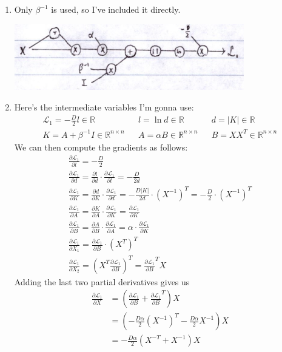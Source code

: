 \documentclass[12pt]{article}
\newcommand{\loss}{\mathcal{L}}
\newcommand{\real}{\mathbb{R}}
\begin{document}
\begin{enumerate}[label=(\alph*)]
    \item Only $\beta^{-1}$ is used, so I've included it directly.
          \begin{center}
              \includegraphics[width=10cm]{img/hw3/l1}
          \end{center} \label{prob:l1}

    \item Here's the intermediate variables I'm gonna use:
          \begin{align*}
              \loss_1=-\frac{D}{2} l \in \real       &  & l=\ln d \in \real                 &  & d=|K| \in \real               \\
              K=A+\beta^{-1}I \in \real^{n \times n} &  & A=\alpha B \in \real^{n \times n} &  & B=XX^T \in \real^{n \times n}
          \end{align*}
          We can then compute the gradients as follows:
          \begin{gather*}
              \frac{\partial \loss_1}{\partial l}=-\frac{D}{2} \\
              \frac{\partial \loss_1}{\partial d}=\frac{\partial l}{\partial d} \cdot \frac{\partial \loss_1}{\partial l}=-\frac{D}{2d} \\
              \frac{\partial \loss_1}{\partial K}=\frac{\partial d}{\partial K} \cdot \frac{\partial \loss_1}{\partial d}=-\frac{D|K|}{2d} \cdot \left(X^{-1}\right)^T=-\frac{D}{2}\cdot \left(X^{-1}\right)^T \\
              \frac{\partial \loss_1}{\partial A}=\frac{\partial K}{\partial A} \cdot \frac{\partial \loss_1}{\partial K}=\frac{\partial \loss_1}{\partial K} \\
              \frac{\partial \loss_1}{\partial B}=\frac{\partial A}{\partial B} \cdot \frac{\partial \loss_1}{\partial A}=\alpha \cdot \frac{\partial \loss_1}{\partial K} \\
              \frac{\partial \loss_1}{\partial X_1}=\frac{\partial \loss_1}{\partial B} \cdot \left(X^T\right)^T \\
              \frac{\partial \loss_1}{\partial X_2}=\left(X^T\frac{\partial \loss_1}{\partial B}\right)^T=\frac{\partial \loss_1}{\partial B}^T X
          \end{gather*}
          Adding the last two partial derivatives gives us
          \begin{align*}
              \frac{\partial \loss_1}{\partial X}
               & = \left(\frac{\partial \loss_1}{\partial B}+\frac{\partial \loss_1}{\partial B}^T\right) X \\
               & = \left(-\frac{D\alpha}{2}\left(X^{-1}\right)^T-\frac{D\alpha}{2}X^{-1}\right)X            \\
               & = \boxed{-\frac{D\alpha}{2}\left(X^{-T}+X^{-1}\right)X}
          \end{align*}


\end{enumerate}
\end{document}
